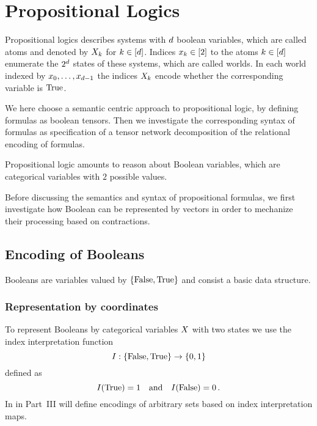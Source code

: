 \section{Propositional Logics}\label{cha:FormulaTensors}\label{cha:logicalRepresentation}

Propositional logics describes systems with $d$ boolean variables, which are called atoms and denoted by $X_{k}$ for $k\in[d]$.
Indices $x_{k}\in[2]$ to the atoms $k\in[d]$ enumerate the $2^d$ states of these systems, which are called worlds.
In each world indexed by ${x_{0},\ldots,x_{d-1}}$ the indices $X_{k}$ encode whether the corresponding variable is $\mathrm{True}$. 

We here choose a semantic centric approach to propositional logic, by defining formulas as boolean tensors.
Then we investigate the corresponding syntax of formulas as specification of a tensor network decomposition of the relational encoding of formulas.

Propositional logic amounts to reason about Boolean variables, which are categorical variables with $2$ possible values.

Before discussing the semantics and syntax of propositional formulas, we first investigate how Boolean can be represented by vectors in order to mechanize their processing based on contractions.

\subsection{Encoding of Booleans}

Booleans are variables valued by $\{\mathrm{False},\mathrm{True}\}$ and consist a basic data structure.


\subsubsection{Representation by coordinates}

To represent Booleans by categorical variables $X$ with two states we use the index interpretation function
	\[ I:\{\mathrm{False},\mathrm{True}\}\rightarrow\{0,1\} \]
defined as
    	\[ I(\mathrm{True}) = 1 \quad \text{and} \quad I(\mathrm{False}) = 0 \, . \]
In  in Part~III will define encodings of arbitrary sets based on index interpretation maps.

